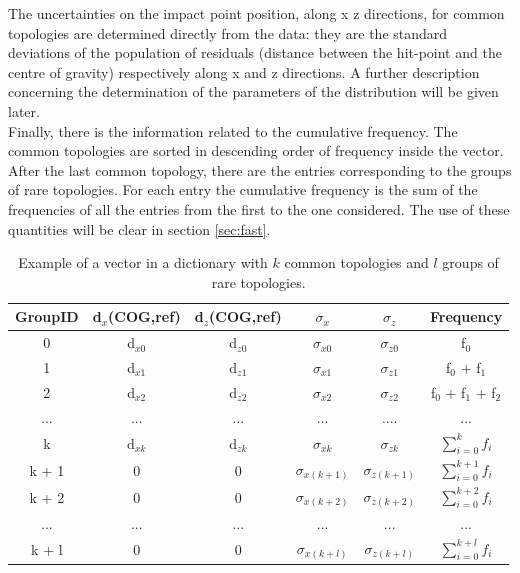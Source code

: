 The uncertainties on the impact point position, along x z directions, for common topologies are determined directly from the data: they are the standard deviations of the population of residuals (distance between the hit-point and the centre of gravity) respectively along x and z directions. A further description concerning the determination of the parameters of the distribution will be given later.\\ 
Finally, there is the information related to the cumulative frequency. The common topologies are sorted in descending order of frequency inside the vector. After the last common topology, there are the entries corresponding to the groups of rare topologies. For each entry the cumulative frequency is the sum of the frequencies of all the entries from the first to the one considered. The use of these quantities will be clear in section \ref{sec:fast}.
%
\begin{table}
\centering
\renewcommand\arraystretch{1.5}
 \begin{tabular}{|c|c|c|c|c|c|}
  \hline
  GroupID & d$_x$(COG,ref) & d$_z$(COG,ref) & $\sigma_x$ & $\sigma_z$ & Frequency\\
  \hline
  0 & d$_{x0}$ & d$_{z0}$ & $\sigma_{x0}$ & $\sigma_{z0}$ & f$_0$\\
  1 & d$_{x1}$ & d$_{z1}$ & $\sigma_{x1}$ & $\sigma_{z1}$ & f$_0$ + f$_1$\\
  2 & d$_{x2}$ & d$_{z2}$ & $\sigma_{x2}$ & $\sigma_{z2}$ & f$_0$ + f$_1$ + f$_2$\\
  ... & ... & ... & ... & .... & ... \\
  k & d$_{xk}$ & d$_{zk}$ & $\sigma_{xk}$ & $\sigma_{zk}$ & $\sum_{i=0}^{k} f_i$ \\
  k + 1 & 0 & 0 & $\sigma_{x(k+1)}$ & $\sigma_{z(k+1)}$ & $\sum_{i=0}^{k+1} f_i$\\
  k + 2 & 0 & 0 & $\sigma_{x(k+2)}$ & $\sigma_{z(k+2)}$ & $\sum_{i=0}^{k+2} f_i$\\
  ... & ... & ... & ... & ... & ...\\
  k + l & 0 & 0 & $\sigma_{x(k+l)}$ & $\sigma_{z(k+l)}$ & $\sum_{i=0}^{k+l} f_i$\\
  \hline
 \end{tabular}
 \caption{Example of a vector in a dictionary with $k$ common topologies and $l$ groups of rare topologies.}
 \label{tab:vec}
\end{table}
%
